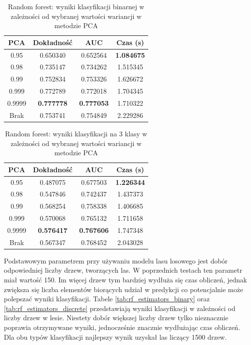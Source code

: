 \documentclass[a4paper, twoside, 11pt, openright]{article}
\begin{document}
\begin{table}[H]
    \centering
    \begin{tabular}{|c|c|c|c|}
    \hline
        \textbf{PCA} & \textbf{Dokładność} & \textbf{AUC} & \textbf{Czas (s)} \\ \hline
0.95               &  0.650340 &  0.652564 &    \textbf{1.084675} \\ \hline
0.98               &  0.735147 &  0.734262 &    1.515345 \\ \hline
0.99               &  0.752834 &  0.753326 &    1.626672 \\ \hline
0.999 &  0.772789 &  0.772018 &    1.704345 \\ \hline
0.9999             &  \textbf{0.777778} &  \textbf{0.777053} &    1.710322 \\ \hline
Brak                &  0.753741 &  0.754849 &    2.229286 \\ \hline
    \end{tabular}
    \caption{Random forest: wyniki klasyfikacji binarnej w zależności od wybranej wartości wariancji w metodzie PCA}
    \label{tab:rf_pca_binary}
\end{table}
\begin{table}[H]
    \centering
    \begin{tabular}{|c|c|c|c|}
    \hline
        \textbf{PCA} & \textbf{Dokładność} & \textbf{AUC} & \textbf{Czas (s)} \\ \hline
0.95               &  0.487075 &  0.677503 &    \textbf{1.226344} \\ \hline
0.98               &  0.547846 &  0.742437 &    1.437373 \\ \hline
0.99               &  0.568254 &  0.758338 &    1.406685 \\ \hline
0.999 &  0.570068 &  0.765132 &    1.711658 \\ \hline
0.9999             &  \textbf{0.576417} &  \textbf{0.767606} &    1.747348 \\ \hline
Brak                &  0.567347 &  0.768452 &    2.043028 \\ \hline
    \end{tabular}
    \caption{Random forest: wyniki klasyfikacji na 3 klasy w zależności od wybranej wartości wariancji w metodzie PCA}
    \label{tab:rf_pca_discrete}
\end{table}

Podstawowym parametrem przy używaniu modelu lasu losowego jest dobór odpowiedniej liczby drzew, tworzących las. W poprzednich testach ten parametr miał wartość 150. Im więcej drzew tym bardziej wydłuża się czas obliczeń, jednak zwiększa się liczba elementów biorących udział w predykcji co potencjalnie może polepszać wyniki klasyfikacji. Tabele \ref{tab:rf_estimators_binary} oraz \ref{tab:rf_estimators_discrete} przedstawiają wyniki klasyfikacji w zależności od liczby drzew w lesie. Niestety dobór większej liczby drzew tylko nieznacznie poprawia otrzymywane wyniki, jednocześnie znacznie wydłużając czas obliczeń. Dla obu typów klasyfikacji najlepszy wynik uzyskał las liczący 1500 drzew.
\end{document}
